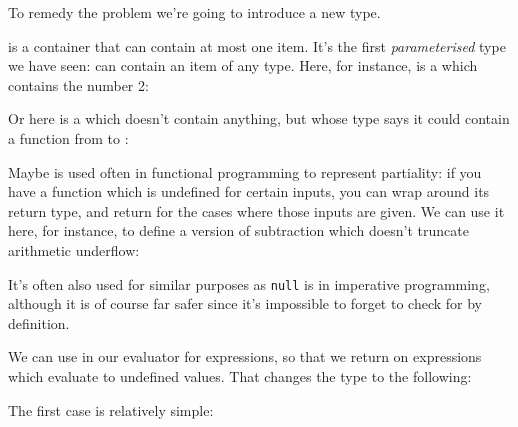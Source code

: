 To remedy the problem we're going to introduce a new type.
\begin{agdalisting}
\end{agdalisting}
 is a container that can contain at most one item.
It's the first \emph{parameterised} type we have seen:  can
contain an item of any type.
Here, for instance, is a  which contains the number 2:
\begin{agdalisting*}
\end{agdalisting*}
Or here is a  which doesn't contain anything, but whose type
says it could contain a function from  to :
\begin{agdalisting*}
\end{agdalisting*}

Maybe is used often in functional programming to represent partiality: if you
have a function which is undefined for certain inputs, you can wrap
 around its return type, and return
 for the cases where those inputs are given.
We can use it here, for instance, to define a version of subtraction which
doesn't truncate arithmetic underflow:
\begin{agdalisting}
\end{agdalisting}
It's often also used for similar purposes as \verb+null+ is in imperative
programming, although it is of course far safer since it's impossible to forget
to check for  by definition.

We can use  in our evaluator for expressions, so that we
return  on expressions which evaluate to
undefined values.
That changes the type to the following:
\begin{agdalisting*}
\end{agdalisting*}
The first case is relatively simple:
\begin{agdalisting*}
\end{agdalisting*}

